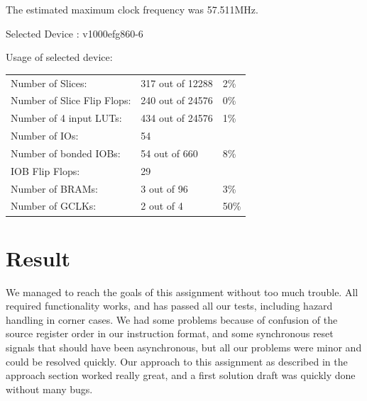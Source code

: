 \documentclass[11pt]{report}
\begin{document}
The estimated maximum clock frequency was 57.511MHz.

Selected Device : v1000efg860-6 

Usage of selected device:
\begin{table}[h]
  \centering
  \begin{tabular}{|l|l|l|} 
    \hline
	Number of Slices:                 &  317  out of  12288 &    2\% \\  
	Number of Slice Flip Flops:       &  240  out of  24576 &    0\% \\
	Number of 4 input LUTs:           &  434  out of  24576 &    1\% \\
	Number of IOs:                    &   54                &        \\
	Number of bonded IOBs:            &   54  out of    660 &    8\% \\
	IOB Flip Flops:                   &   29                &        \\
	Number of BRAMs:                  &    3  out of     96 &    3\% \\
	Number of GCLKs:                  &    2  out of      4 &   50\% \\
    \hline
  \end{tabular}
\end{table}


\section*{Result}


We managed to reach the goals of this assignment without too much trouble.
All required functionality works, and has passed all our tests, including
hazard handling in corner cases. We had some problems because of confusion
of the source register order in our instruction format, and some synchronous
reset signals that should have been asynchronous, but all our problems were 
minor and could be resolved quickly. Our approach to this assignment as described
in the approach section worked really great, and a first solution draft was 
quickly done without many bugs. 
\end{document}
